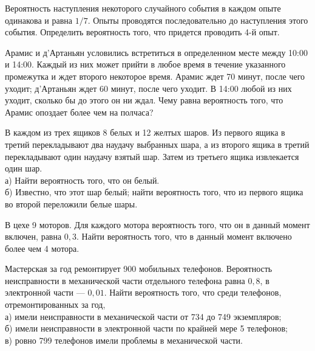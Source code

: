 \newpage\setcounter{zad}{0}



\begin{zkrW}{20}\noindent 
	Вероятность наступления некоторого случайного события в каждом опыте одинакова и равна $1/7$. Опыты проводятся последовательно до наступления этого события. Определить вероятность того, что придется проводить 4-й опыт.
 
\end{zkrW}

\begin{zkrW}{20}\noindent 
	Арамис и д'Артаньян условились встретиться в определенном месте между 10:00 и 14:00. Каждый из них может прийти в любое время в течение указанного промежутка и ждет второго некоторое время. Арамис ждет 70 минут, после чего уходит; д'Артаньян ждет 60 минут, после чего уходит. В 14:00 любой из них уходит, сколько бы до этого он ни ждал. Чему равна вероятность того, что Арамис опоздает более чем на полчаса?
 
\end{zkrW}

\begin{zkrW}{20}\noindent 
	В каждом из трех ящиков 8 белых и 12 желтых шаров. Из первого ящика в третий перекладывают два наудачу выбранных шара, а из второго ящика в третий перекладывают один наудачу взятый шар. Затем из третьего ящика извлекается один шар. \\ \indent а) Найти вероятность того, что он белый. \\ \indent б) Известно, что этот шар белый; найти вероятность того, что из первого ящика во второй переложили белые шары.
 
\end{zkrW}

\begin{zkrW}{20}\noindent 
	В цехе 9 моторов. Для каждого мотора вероятность того, что он в данный момент включен, равна $0{,}3$. Найти вероятность того, что в данный момент включено более чем 4 мотора.
 
\end{zkrW}

\begin{zkrW}{20}\noindent 
	Мастерская за год ремонтирует 900 мобильных телефонов. Вероятность неисправности в механической части отдельного телефона равна $0{,}8$, в электронной части --- $0{,}01$. Найти вероятность того, что среди телефонов, отремонтированных за год, \\ \indent а) имели неисправности в механической части от 734 до 749 экземпляров; \\ \indent б) имели неисправности в электронной части по крайней мере 5 телефонов; \\ \indent в) ровно 799 телефонов имели проблемы в механической части.
 
\end{zkrW}

